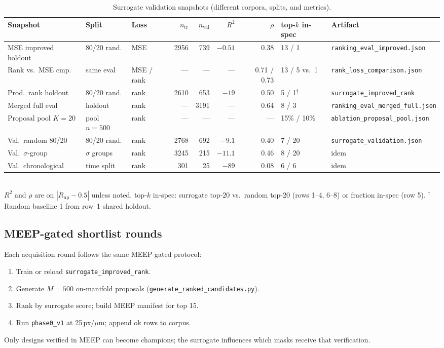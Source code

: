 \documentclass[11pt,a4paper]{article}
\begin{document}
\begin{table}[t]
  \centering
  \caption{Surrogate validation snapshots (different corpora, splits, and metrics).}
  \label{tab:surrogate_snapshots}
  \small
  \begin{tabular}{p{2.1cm}p{1.5cm}p{0.9cm}rrrrp{1.1cm}p{1.4cm}}
    \toprule
    Snapshot & Split & Loss & $n_{\mathrm{tr}}$ & $n_{\mathrm{val}}$ & $R^2$ & $\rho$ & top-$k$ in-spec & Artifact \\
    \midrule
    MSE improved holdout & 80/20 rand. & MSE & 2956 & 739 & $-0.51$ & 0.38 & 13 / 1 & \texttt{ranking\_eval\_improved.json} \\
    Rank vs.\ MSE cmp. & same eval & MSE / rank & --- & --- & --- & 0.71 / 0.73 & 13 / 5 vs.\ 1 & \texttt{rank\_loss\_comparison.json} \\
    Prod.\ rank holdout & 80/20 rand. & rank & 2610 & 653 & $-19$ & 0.50 & 5 / 1$^\dagger$ & \texttt{surrogate\_improved\_rank} \\
    Merged full eval & holdout & rank & --- & 3191 & --- & 0.64 & 8 / 3 & \texttt{ranking\_eval\_merged\_full.json} \\
    Proposal pool $K{=}20$ & pool $n{=}500$ & rank & --- & --- & --- & --- & 15\% / 10\% & \texttt{ablation\_proposal\_pool.json} \\
    Val.\ random 80/20 & 80/20 rand. & rank & 2768 & 692 & $-9.1$ & 0.40 & 7 / 20 & \texttt{surrogate\_validation.json} \\
    Val.\ $\sigma$-group & $\sigma$ groups & rank & 3245 & 215 & $-11.1$ & 0.46 & 8 / 20 & idem \\
    Val.\ chronological & time split & rank & 301 & 25 & $-89$ & 0.08 & 6 / 6 & idem \\
    \bottomrule
  \end{tabular}
  \\[0.3em]
  {\footnotesize $R^2$ and $\rho$ are on $|R_{\mathrm{up}}-0.5|$ unless noted. top-$k$ in-spec: surrogate top-20 vs.\ random top-20 (rows 1--4, 6--8) or fraction in-spec (row 5). $^\dagger$Random baseline 1 from row~1 shared holdout.}
\end{table}

\subsection{MEEP-gated shortlist rounds}

Each acquisition round follows the same MEEP-gated protocol:
\begin{enumerate}
  \item Train or reload \texttt{surrogate\_improved\_rank}.
  \item Generate $M=500$ on-manifold proposals (\texttt{generate\_ranked\_candidates.py}).
  \item Rank by surrogate score; build MEEP manifest for top 15.
  \item Run \texttt{phase0\_v1} at 25\,px/$\mu$m; append ok rows to corpus.
\end{enumerate}
Only designs verified in MEEP can become champions; the surrogate influences which masks receive that verification.
\end{document}
